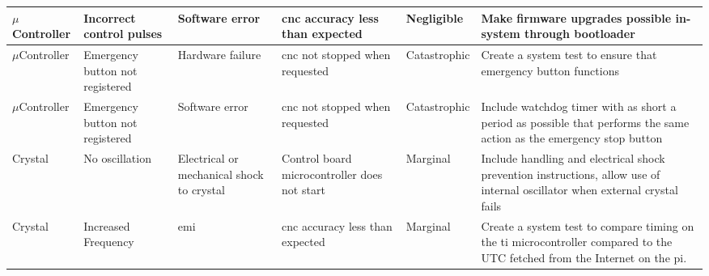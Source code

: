 \begin{table}[h]
{\begin{tabular}{|m{2cm}|m{2cm}|m{2cm}|m{3cm}|m{1.7cm}|m{5cm}|}
	$\mu$Controller & Incorrect control pulses & Software error & \gls{cnc} accuracy less than expected & Negligible & Make firmware upgrades possible in-system through bootloader \\ \hline
	$\mu$Controller & Emergency button not registered & Hardware failure & \gls{cnc} not stopped when requested & Catastrophic & Create a system test to ensure that emergency button functions \\ \hline
	$\mu$Controller & Emergency button not registered & Software error & \gls{cnc} not stopped when requested & Catastrophic & Include watchdog timer with as short a period as possible that performs the same action as the emergency stop button \\ \hline
	Crystal & No oscillation & Electrical or mechanical shock to crystal & Control board microcontroller does not start & Marginal & Include handling and electrical shock prevention instructions, allow use of internal oscillator when external crystal fails \\ \hline
	Crystal & Increased Frequency & \gls{emi}\cite{emicrystal} & \gls{cnc} accuracy less than expected & Marginal & Create a system test to compare timing on the \gls{ti} microcontroller compared to the UTC fetched from the Internet on the \gls{pi}. \\ \hline
\end{tabular}
}
\end{table}